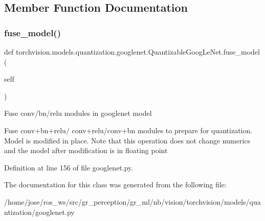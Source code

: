 \subsection{Member Function Documentation}
\mbox{\label{classtorchvision_1_1models_1_1quantization_1_1googlenet_1_1QuantizableGoogLeNet_aecb41b91188928894b629273591b103c}} 
\subsubsection{\texorpdfstring{fuse\+\_\+model()}{fuse\_model()}}
{\footnotesize\ttfamily def torchvision.\+models.\+quantization.\+googlenet.\+Quantizable\+Goog\+Le\+Net.\+fuse\+\_\+model (\begin{DoxyParamCaption}\item[{}]{self }\end{DoxyParamCaption})}

\begin{DoxyVerb}Fuse conv/bn/relu modules in googlenet model

Fuse conv+bn+relu/ conv+relu/conv+bn modules to prepare for quantization.
Model is modified in place.  Note that this operation does not change numerics
and the model after modification is in floating point
\end{DoxyVerb}
 

Definition at line 156 of file googlenet.\+py.



The documentation for this class was generated from the following file\+:\begin{DoxyCompactItemize}
\item 
/home/jose/ros\+\_\+ws/src/gr\+\_\+perception/gr\+\_\+ml/nb/vision/torchvision/models/quantization/googlenet.\+py\end{DoxyCompactItemize}
